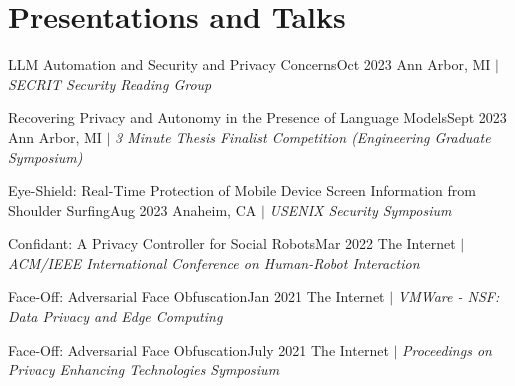 \section{Presentations and Talks}
  \CVSubHeadingListStart
    \CVSubheading
      {{LLM Automation and Security and Privacy Concerns\cite{steward}}}{Oct 2023}
      {{Ann Arbor, MI} $|$ \emph{\small{SECRIT Security Reading Group}}}{}

    \CVSubheading
      {{Recovering Privacy and Autonomy in the Presence of Language Models}}{Sept 2023}
      {{Ann Arbor, MI} $|$ \emph{\small{3 Minute Thesis Finalist Competition (Engineering Graduate Symposium)}}}{}

    \CVSubheading
      {{Eye-Shield: Real-Time Protection of Mobile Device Screen Information from Shoulder Surfing}\cite{ShoulderSurfing}}{Aug 2023}
      {{Anaheim, CA} $|$ \emph{\small{USENIX Security Symposium}}}{}

    \CVSubheading
      {{Confidant: A Privacy Controller for Social Robots}\cite{HRIPrivacy}}{Mar 2022}
      {{The Internet} $|$ \emph{\small{ACM/IEEE International Conference on Human-Robot Interaction}}}{}

    \CVSubheading
      {{Face-Off: Adversarial Face Obfuscation}\cite{FaceOff}}{Jan 2021}
      {{The Internet} $|$ \emph{\small{VMWare - NSF: Data Privacy and Edge Computing}}}{}
      
    \CVSubheading
      {{Face-Off: Adversarial Face Obfuscation}\cite{FaceOff}}{July 2021}
      {{The Internet} $|$ \emph{\small{Proceedings on Privacy Enhancing Technologies Symposium}}}{}
  \CVSubHeadingListEnd
